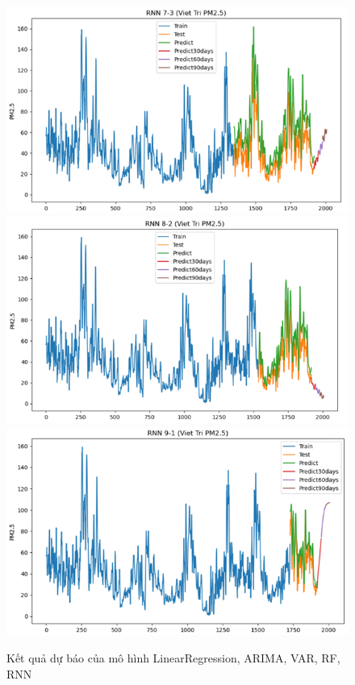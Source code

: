 \begin{figure}[H]
{\begin{adjustbox}{minipage=0.48\textwidth}
\begin{minipage}{0.3\textwidth}
            \end{minipage}\hfill
            \begin{minipage}{0.3\textwidth}
                \centering
                \includegraphics[width=\textwidth]{img/final/RNN/90D/RNN_7_3_VT.png}\\
                \includegraphics[width=\textwidth]{img/final/RNN/90D/RNN_8_2_VT.png}\\
                \includegraphics[width=\textwidth]{img/final/RNN/90D/RNN_9_1_VT.png}
            \end{minipage}
        \end{adjustbox}
    }

    \caption{Kết quả dự báo của mô hình LinearRegression, ARIMA, VAR, RF, RNN }
    \label{fig:ARIMA}

\end{figure}

